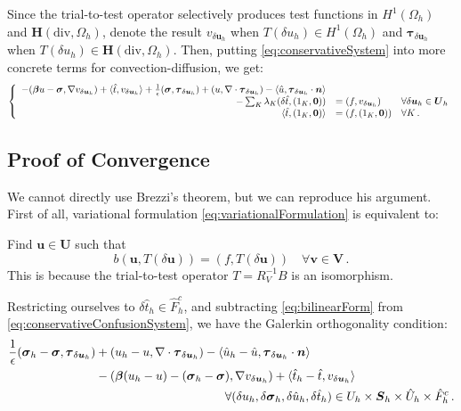 \documentclass[letterpaper]{article}
\def\btau{\boldsymbol\tau}
\def\bsigma{\boldsymbol\sigma}
\def\bbeta{\boldsymbol\beta}
\newcommand{\bs}[1]{\boldsymbol{#1}}
\newcommand{\vdeltau}{v_{\delta\bs u_h}}
\newcommand{\taudeltau}{\btau_{\delta\bs u_h}}
\begin{document}
Since the trial-to-test operator selectively produces test functions in
$H^1(\Omega_h)$ and $\bs H(\text{div},\Omega_h)$, denote the result
$v_{\delta\bs u_h}$ when $T(\delta u_h)\in H^1(\Omega_h)$ and
$\btau_{\delta\bs u_h}$ when $T(\delta u_h)\in \bs H(\text{div},\Omega_h)$.
Then, putting \eqref{eq:conservativeSystem} into more concrete terms for
convection-diffusion, we get:
\begin{equation}
\left\{
\begin{array}[c]{rll}
-(\bbeta u-\bsigma,\nabla \vdeltau)+\langle\hat t,\vdeltau\rangle
+ \frac{1}{\epsilon}(\bsigma,\taudeltau)
+(u,\nabla\cdot\taudeltau)
-\langle\hat u,\taudeltau\cdot\bs n\rangle\\
-\sum_K\lambda_K (\delta\hat t,(1_K,\bs0))
&=(f,\vdeltau) & \forall\delta\bs u_h\in\bs U_h\\
\langle\hat t,(1_K,\bs0)\rangle &=(f,(1_K,\bs0)) & \forall K\,.
\end{array}
\right.
\label{eq:conservativeConfusionSystem}
\end{equation}

\subsection{Proof of Convergence}
We cannot directly use Brezzi's theorem, but we can reproduce his argument.
First of all, variational formulation \eqref{eq:variationalFormulation} is
equivalent to:

Find $\bs u\in\bs U$ such that
\begin{equation}
b(\bs u,T(\delta\bs u))=(f,T(\delta\bs u))\quad\forall\bs v\in\bs V\,.
\label{eq:bilinearForm}
\end{equation}
This is because the trial-to-test operator $T=R_V^{-1}B$ is an isomorphism.

Restricting ourselves to $\delta\hat t_h\in\hat F_h^c$, and subtracting
\eqref{eq:bilinearForm} from \eqref{eq:conservativeConfusionSystem}, we have
the Galerkin orthogonality condition:
\begin{align}
\label{eq:galerkinOrthogonality}
\frac{1}{\epsilon}(\bsigma_h-\bsigma,\taudeltau)
&+(u_h-u,\nabla\cdot\taudeltau)
-\langle\hat u_h-\hat u,\taudeltau\cdot\bs n\rangle
\nonumber\\
&-(\bbeta(u_h-u)-(\bsigma_h-\bsigma),\nabla\vdeltau)
+\langle\hat t_h-\hat t,\vdeltau\rangle
\\
&\hspace{25ex}\forall(\delta u_h,\delta\bsigma_h,\delta\hat u_h,\delta\hat t_h)
\in U_h\times\bs S_h\times\hat U_h\times\hat F_h^c\,.
\nonumber
\end{align}
\end{document}
